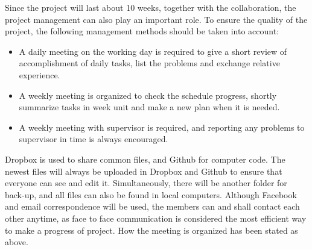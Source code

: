 Since the project will last about 10 weeks, together with the collaboration,
the project management can also play an important role. To ensure the quality of
the project, the following management methods should be taken into account:

\begin{itemize}
  \item A daily meeting on the working day is required to give a short review of
    accomplishment of daily tasks, list the problems and exchange relative
    experience.
  \item A weekly meeting is organized to check the schedule progress, shortly
    summarize tasks in week unit and make a new plan when it is needed.
  \item A weekly meeting with supervisor is required, and reporting any problems
    to supervisor in time is always encouraged.
\end{itemize}

Dropbox is used to share common files, and Github for computer code. The
newest files will always be uploaded in Dropbox and Github to ensure that everyone
can see and edit it. Simultaneously, there will be another folder for back-up,
and all files can also be found in local computers. Although Facebook and email
correspondence will be used, the members can and shall contact each other
anytime, as face to face communication is considered the most efficient way to
make a progress of project. How the meeting is organized has been stated as above.
